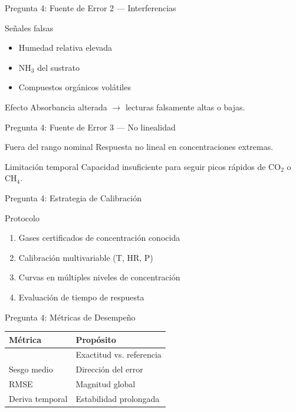 \documentclass[aspectratio=169, 11pt]{beamer}
\newcommand{\MAPE}{\text{MAPE}}
\begin{document}
\begin{frame}{Pregunta 4: Fuente de Error 2 --- Interferencias}
\begin{alertblock}{Señales falsas}
\footnotesize
\begin{itemize}
    \item Humedad relativa elevada
    \item NH$_3$ del sustrato
    \item Compuestos orgánicos volátiles
\end{itemize}
\end{alertblock}
\begin{block}{Efecto}
\footnotesize
Absorbancia alterada $\rightarrow$ lecturas falsamente altas o bajas.
\end{block}
\end{frame}

\begin{frame}{Pregunta 4: Fuente de Error 3 --- No linealidad}
\begin{block}{Fuera del rango nominal}
\footnotesize
Respuesta no lineal en concentraciones extremas.
\end{block}
\begin{alertblock}{Limitación temporal}
\footnotesize
Capacidad insuficiente para seguir picos rápidos de CO$_2$ o CH$_4$.
\end{alertblock}
\end{frame}

\begin{frame}{Pregunta 4: Estrategia de Calibración}
\begin{exampleblock}{Protocolo}
\footnotesize
\begin{enumerate}
    \item Gases certificados de concentración conocida
    \item Calibración multivariable (T, HR, P)
    \item Curvas en múltiples niveles de concentración
    \item Evaluación de tiempo de respuesta
\end{enumerate}
\end{exampleblock}
\end{frame}

\begin{frame}{Pregunta 4: Métricas de Desempeño}
\centering
\footnotesize
\begin{tabular}{@{}ll@{}}
\toprule
Métrica & Propósito \\
\midrule
\MAPE & Exactitud vs. referencia \\
Sesgo medio & Dirección del error \\
RMSE & Magnitud global \\
Deriva temporal & Estabilidad prolongada \\
\bottomrule
\end{tabular}
\end{frame}
\end{document}

